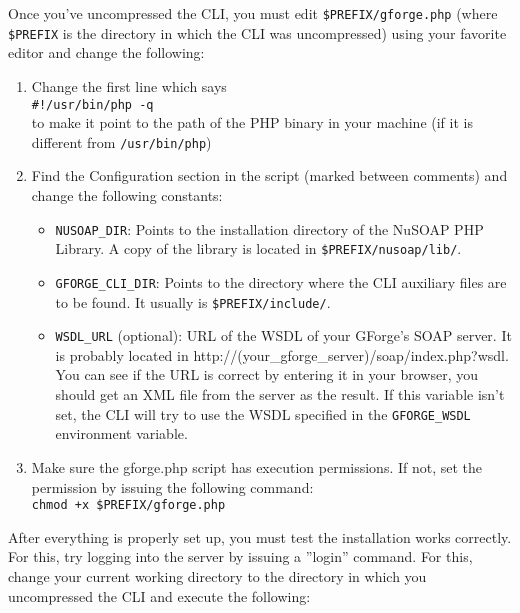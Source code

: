 \documentclass[a4]{article}
\begin{document}
Once you've uncompressed the CLI, you must edit \verb|$PREFIX/gforge.php| (where
\verb|$PREFIX| is the directory in which the CLI was uncompressed) using your favorite
editor and change the following:
\begin{enumerate}
    \item Change the first line which says \\
    \verb|#!/usr/bin/php -q| \\
    to make it point to the path of the PHP binary in your machine (if it is different
    from \verb|/usr/bin/php|)
    \item Find the Configuration section in the script (marked between comments) and
    change the following constants:
    \begin{itemize}
        \item \verb|NUSOAP_DIR|: Points to the installation directory of the NuSOAP PHP
        Library. A copy of the library is located in \verb|$PREFIX/nusoap/lib/|.
        \item \verb|GFORGE_CLI_DIR|: Points to the directory where the CLI auxiliary files
        are to be found. It usually is \verb|$PREFIX/include/|.
        \item \verb|WSDL_URL| (optional): URL of the WSDL of your GForge's SOAP server.
        It is probably located in http://(your\_gforge\_server)/soap/index.php?wsdl.
        You can see if the URL is correct by entering it in your browser, you should
        get an XML file from the server as the result. If this variable isn't set, the CLI
        will try to use the WSDL specified in the \verb|GFORGE_WSDL| environment variable.
    \end{itemize}
    \item Make sure the gforge.php script has execution permissions. If not, set the
    permission by issuing the following command:\\
    \verb|chmod +x $PREFIX/gforge.php|
\end{enumerate}

After everything is properly set up, you must test the installation works correctly. For
this, try logging into the server by issuing a ''login'' command. For this, change your
current working directory to the directory in which you uncompressed the CLI and execute
the following:
\end{document}
